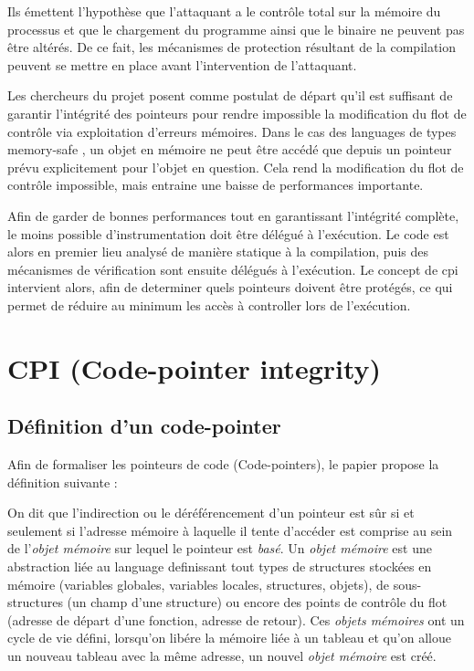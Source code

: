 Ils émettent l'hypothèse que l'attaquant a le contrôle total sur la mémoire du processus et que le chargement du programme ainsi que le binaire ne peuvent pas être altérés. De ce fait, les mécanismes de protection résultant de la compilation peuvent se mettre en place avant l'intervention de l'attaquant.

Les chercheurs du projet posent comme postulat de départ qu'il est suffisant de garantir l'intégrité des pointeurs pour rendre impossible la modification du flot de contrôle via exploitation d'erreurs mémoires. Dans le cas des languages de types \og memory-safe \fg, un objet en mémoire ne peut être accédé que depuis un pointeur prévu explicitement pour l'objet en question. Cela rend la modification du flot de contrôle impossible, mais entraine une baisse de performances importante.

Afin de garder de bonnes performances tout en garantissant l'intégrité complète, le moins possible d'instrumentation doit être délégué à l'exécution. Le code est alors en premier lieu analysé de manière statique à la compilation, puis des mécanismes de vérification sont ensuite délégués à l'exécution. Le concept de \gls{cpi} \cite{CPIPaper} intervient alors, afin de determiner quels pointeurs doivent être protégés, ce qui permet de réduire au minimum les accès à controller lors de l'exécution.

\section{CPI (Code-pointer integrity)}


\subsection{Définition d'un code-pointer}

Afin de formaliser les pointeurs de code (Code-pointers), le papier propose la définition suivante :

On dit que l'indirection ou le déréférencement d'un pointeur est sûr si et seulement si l'adresse mémoire à laquelle il tente d'accéder est comprise au sein de l'\textit{objet mémoire} sur lequel le pointeur est \textit{basé}. Un \textit{objet mémoire} est une abstraction liée au language definissant tout types de structures stockées en mémoire (variables globales, variables locales, structures, objets), de sous-structures (un champ d'une structure) ou encore des points de contrôle du flot (adresse de départ d'une fonction, adresse de retour). Ces \textit{objets mémoires} ont un cycle de vie défini, lorsqu'on libére la mémoire liée à un tableau et qu'on alloue un nouveau tableau avec la même adresse, un nouvel \textit{objet mémoire} est créé.

